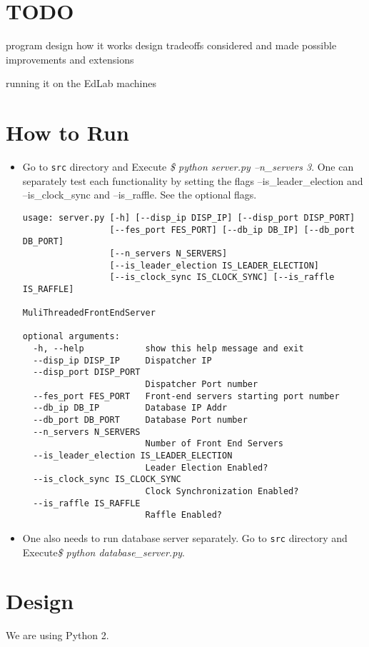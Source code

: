 \documentclass{article}
\begin{document}
\section{TODO}
program design 
how it works
design tradeoffs considered and made
possible improvements and extensions


running it on the EdLab machines

\section{How to Run}
\begin{itemize}
\item Go to {\tt src} directory and Execute {\it \$ python server.py --n\_servers 3}. One can separately test each functionality by setting the flags --is\_leader\_election and --is\_clock\_sync and --is\_raffle. See the optional flags.
\begin{Verbatim}[commandchars=\\\{\}]
usage: server.py [-h] [--disp_ip DISP_IP] [--disp_port DISP_PORT]
                 [--fes_port FES_PORT] [--db_ip DB_IP] [--db_port DB_PORT]
                 [--n_servers N_SERVERS]
                 [--is_leader_election IS_LEADER_ELECTION]
                 [--is_clock_sync IS_CLOCK_SYNC] [--is_raffle IS_RAFFLE]

MuliThreadedFrontEndServer

optional arguments:
  -h, --help            show this help message and exit
  --disp_ip DISP_IP     Dispatcher IP
  --disp_port DISP_PORT
                        Dispatcher Port number
  --fes_port FES_PORT   Front-end servers starting port number
  --db_ip DB_IP         Database IP Addr
  --db_port DB_PORT     Database Port number
  --n_servers N_SERVERS
                        Number of Front End Servers
  --is_leader_election IS_LEADER_ELECTION
                        Leader Election Enabled?
  --is_clock_sync IS_CLOCK_SYNC
                        Clock Synchronization Enabled?
  --is_raffle IS_RAFFLE
                        Raffle Enabled?

\end{Verbatim} 
\item One also needs to run database server separately. Go to {\tt src} directory and Execute{\it \$ python database\_server.py}.
\end{itemize}


\section{Design}
We are using Python 2.
\end{document}
